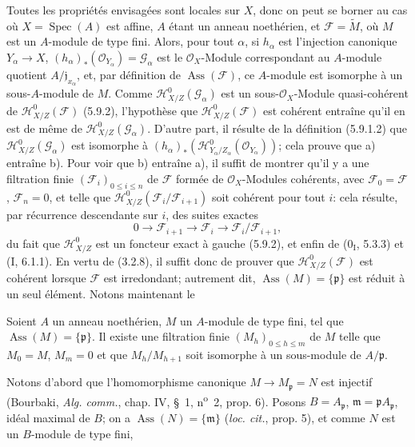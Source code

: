 Toutes les propriétés envisagées sont locales sur $X$, donc on peut se borner
au cas où $X=\operatorname{Spec}(A)$ est affine, $A$ étant un anneau
noethérien, et $\mathcal F=\widetilde M$, où $M$ est un $A$-module de type
fini. Alors, pour tout $\alpha$, si $h_\alpha$ est l'injection canonique
$Y_\alpha\to X$, $(h_\alpha)_*(\mathcal O_{Y_\alpha})=\mathcal G_\alpha$ est
le $\mathcal O_X$-Module correspondant au $A$-module quotient
$A/\mathfrak j_{x_\alpha}$, et, par définition de
$\operatorname{Ass}(\mathcal F)$, ce $A$-module est isomorphe à un
sous-$A$-module de $M$. Comme $\mathcal H^0_{X/Z}(\mathcal G_\alpha)$ est un
sous-$\mathcal O_X$-Module quasi-cohérent de
$\mathcal H^0_{X/Z}(\mathcal F)$ (5.9.2), l'hypothèse que
$\mathcal H^0_{X/Z}(\mathcal F)$ est cohérent entraîne qu'il en est de même de
$\mathcal H^0_{X/Z}(\mathcal G_\alpha)$. D'autre part, il résulte de la
définition (5.9.1.2) que $\mathcal H^0_{X/Z}(\mathcal G_\alpha)$ est
isomorphe à
$(h_\alpha)_*(\mathcal H^0_{Y_\alpha/Z_\alpha}(\mathcal O_{Y_\alpha}))$;
cela prouve que a) entraîne b). Pour voir que b) entraîne a), il suffit de
montrer qu'il y a une filtration finie $(\mathcal F_i)_{0\leq i\leq n}$ de
$\mathcal F$ formée de $\mathcal O_X$-Modules cohérents, avec
$\mathcal F_0=\mathcal F$, $\mathcal F_n=0$, et telle que
$\mathcal H^0_{X/Z}(\mathcal F_i/\mathcal F_{i+1})$ soit cohérent pour tout
$i$: cela résulte, par récurrence descendante sur $i$, des suites exactes
\[
0\longrightarrow\mathcal F_{i+1}\longrightarrow\mathcal F_i
\longrightarrow\mathcal F_i/\mathcal F_{i+1},
\]
du fait que $\mathcal H^0_{X/Z}$ est un foncteur exact à gauche (5.9.2), et
enfin de (0$_\mathrm I$, 5.3.3) et (I, 6.1.1). En vertu de (3.2.8), il suffit
donc de prouver que $\mathcal H^0_{X/Z}(\mathcal F)$ est cohérent lorsque
$\mathcal F$ est irredondant; autrement dit,
$\operatorname{Ass}(M)=\{\mathfrak p\}$ est réduit à un seul élément. Notons
maintenant le

\begin{lemma}[5.11.1.1]
\label{IV.2.s5.11.1.1-fr}
Soient $A$ un anneau noethérien, $M$ un $A$-module de type fini, tel que
$\operatorname{Ass}(M)=\{\mathfrak p\}$. Il existe une filtration finie
$(M_h)_{0\leq h\leq m}$ de $M$ telle que $M_0=M$, $M_m=0$ et que
$M_h/M_{h+1}$ soit isomorphe à un sous-module de $A/\mathfrak p$.
\end{lemma}

Notons d'abord que l'homomorphisme canonique $M\to M_\mathfrak p=N$ est
injectif (Bourbaki, \emph{Alg. comm.}, chap. IV, \S~1, n\textsuperscript{o}~2,
prop. 6). Posons $B=A_\mathfrak p$, $\mathfrak m=\mathfrak pA_\mathfrak p$,
idéal maximal de $B$; on a $\operatorname{Ass}(N)=\{\mathfrak m\}$
(\emph{loc. cit.}, prop. 5), et comme $N$ est un $B$-module de type fini,

